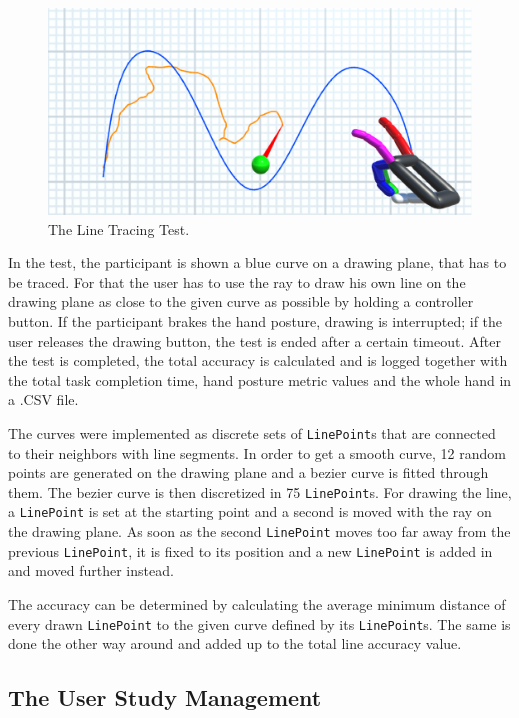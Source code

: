 \begin{figure}
\centering
\includegraphics[width=\textwidth]{linetracing}
\caption{The Line Tracing Test.}
\label{fig:line}
\end{figure}

In the test, the participant is shown a blue curve on a drawing plane, that has to be traced. For that the user has to use the ray to draw his own line on the drawing plane as close to the given curve as possible by holding a controller button. If the participant brakes the hand posture, drawing is interrupted; if the user releases the drawing button, the test is ended after a certain timeout.
After the test is completed, the total accuracy is calculated and is logged together with the total task completion time, hand posture metric values and the whole hand in a .CSV file.

The curves were implemented as discrete sets of \texttt{LinePoint}s that are connected to their neighbors with line segments. In order to get a smooth curve, 12 random points are generated on the drawing plane and a bezier curve is fitted through them. The bezier curve is then discretized in 75 \texttt{LinePoint}s. For drawing the line, a \texttt{LinePoint} is set at the starting point and a second is moved with the ray on the drawing plane. As soon as the second \texttt{LinePoint} moves too far away from the previous \texttt{LinePoint}, it is fixed to its position and a new \texttt{LinePoint} is added in and moved further instead.

The accuracy can be determined by calculating the average minimum distance of every drawn \texttt{LinePoint} to the given curve defined by its \texttt{LinePoint}s. The same is done the other way around and added up to the total line accuracy value. 

\subsection{The User Study Management}

